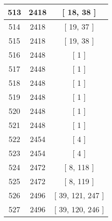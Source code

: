 \begin{center}
\begin{longtable}[H]{|| c c c ||}
\\\hline
513 & 2418 & [ 18, 38 ]
\\\hline
514 & 2418 & [ 19, 37 ]
\\\hline
515 & 2418 & [ 19, 38 ]
\\\hline
516 & 2448 & [ 1 ]
\\\hline
517 & 2448 & [ 1 ]
\\\hline
518 & 2448 & [ 1 ]
\\\hline
519 & 2448 & [ 1 ]
\\\hline
520 & 2448 & [ 1 ]
\\\hline
521 & 2448 & [ 1 ]
\\\hline
522 & 2454 & [ 4 ]
\\\hline
523 & 2454 & [ 4 ]
\\\hline
524 & 2472 & [ 8, 118 ]
\\\hline
525 & 2472 & [ 8, 119 ]
\\\hline
526 & 2496 & [ 39, 121, 247 ]
\\\hline
527 & 2496 & [ 39, 120, 246 ]
\\\hline
\end{longtable}
\end{center}
